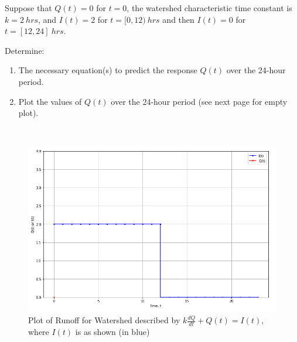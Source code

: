 \documentclass[12pt]{article}
\begin{document}
\begin{enumerate}
Suppose that $Q(t)=0$ for $t=0$, the watershed characteristic time constant is $k=2~hrs$, and $I(t) =2$ for $t=[0,12)~hrs$ and then $I(t) =0$ for $t=[12,24]~hrs$. 

Determine:
\begin{enumerate}
\item The necessary equation(s) to predict the response $Q(t)$ over the 24-hour period.
\item Plot the values of $Q(t)$ over the 24-hour period (see next page for empty plot).
\end{enumerate}
\clearpage
~\newline
~\newline
~\newline
~\newline
~\newline
~\newline
~\newline
~\newline
~\newline
~\newline
~\newline
~\newline
~\newline
~\newline
\begin{figure}[h!] %
   \centering
   \includegraphics[width=6.0in]{HydrographPlot001.png} 
   \caption{Plot of Runoff for Watershed described by $k\frac{dQ}{dt} + Q(t) = I(t)$, where $I(t)$ is as shown (in blue)}
   \label{fig:topoMap.jpg}
\end{figure}
\clearpage


\end{enumerate}
\end{document}
